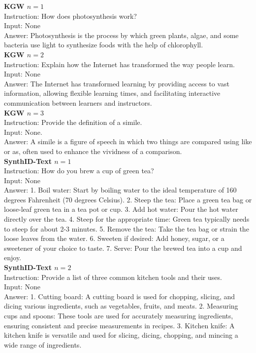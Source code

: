 \begin{figure*}[h!]
\begin{tcolorbox}[colback=gray!10, colframe=black, rounded corners]
\textbf{KGW $n=1$} \\[0.5em]
Instruction: How does photosynthesis work? \\
Input: None \\
Answer: Photosynthesis is the process by which green plants, algae, and some bacteria use light to synthesize foods with the help of chlorophyll. \\

\textbf{KGW $n=2$} \\[0.5em]
Instruction: Explain how the Internet has transformed the way people learn.\\
Input: None\\
Answer: The Internet has transformed learning by providing access to vast information, allowing flexible learning times, and facilitating interactive communication between learners and instructors.\\

\textbf{KGW $n=3$} \\[0.5em]
Instruction: Provide the definition of a simile.\\
Input: None.\\
Answer: A simile is a figure of speech in which two things are compared using like or as, often used to enhance the vividness of a comparison.\\

\textbf{SynthID-Text $n=1$} \\[0.5em]
Instruction: How do you brew a cup of green tea? \\
Input: None \\
Answer: 1. Boil water: Start by boiling water to the ideal temperature of 160 degrees Fahrenheit (70 degrees Celsius). 2. Steep the tea: Place a green tea bag or loose-leaf green tea in a tea pot or cup. 3. Add hot water: Pour the hot water directly over the tea. 4. Steep for the appropriate time: Green tea typically needs to steep for about 2-3 minutes. 5. Remove the tea: Take the tea bag or strain the loose leaves from the water. 6. Sweeten if desired: Add honey, sugar, or a sweetener of your choice to taste. 7. Serve: Pour the brewed tea into a cup and enjoy.\\

\textbf{SynthID-Text $n=2$} \\[0.5em]
Instruction: Provide a list of three common kitchen tools and their uses. \\
Input: None \\
Answer: 1. Cutting board: A cutting board is used for chopping, slicing, and dicing various ingredients, such as vegetables, fruits, and meats. 2. Measuring cups and spoons: These tools are used for accurately measuring ingredients, ensuring consistent and precise measurements in recipes. 3. Kitchen knife: A kitchen knife is versatile and used for slicing, dicing, chopping, and mincing a wide range of ingredients.\\


\end{tcolorbox}
\end{figure*}
